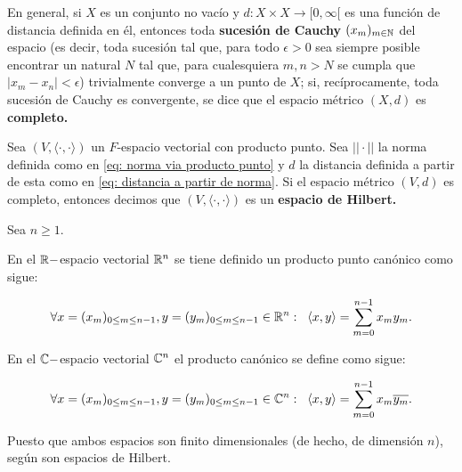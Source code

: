 En general, si $X$ es un conjunto no vacío y 
$d: X \times X \longrightarrow [0, \infty[$ es una función de distancia
definida en él, entonces toda \textbf{sucesión de Cauchy}
$(x_{m})_{m \in \mathbb{N}}$ del espacio (es decir, toda sucesión
tal que, para todo $\epsilon >0$ sea siempre posible encontrar
un natural $N$ tal que, para cualesquiera $m, n >N$ se cumpla que
$|x_{m}-x_{n}| < \epsilon$) trivialmente converge a un punto
de $X$; 
si, recíprocamente, toda sucesión de Cauchy es convergente, 
se dice que el espacio métrico $(X, d)$ es \textbf{completo.}



\begin{defi}
\label{def: espacio de Hilbert}
Sea $(V, \langle \cdot , \cdot \rangle )$ un $F$-espacio
vectorial con producto punto. Sea $|| \cdot ||$ la norma definida como en 
\eqref{eq: norma via producto punto} y 
$d$ la distancia definida a partir de esta como en 
\eqref{eq: distancia a partir de norma}. Si el espacio
métrico $(V, d)$ es completo, entonces decimos que 
$(V, \langle \cdot , \cdot \rangle )$ es un \textbf{espacio de Hilbert.}
\end{defi}


\begin{ejemplo}
Sea $n \geq 1$.

En el $\mathbb{R}-$espacio vectorial $\mathbb{R}^{n}$ se tiene definido un 
producto punto canónico como sigue:

\begin{equation}
\label{eq: producto punto Rn}
\forall x=(x_{m})_{0 \leq m \leq n-1}, 
y=(y_{m})_{0 \leq m \leq n-1} \in \mathbb{R}^{n}: \hspace{0.2cm}
\langle x, y \rangle = \sum\limits_{m=0}^{n-1}x_{m} y_{m}.
\end{equation}

\noindent
En el $\mathbb{C}-$espacio vectorial $\mathbb{C}^{n}$ el producto canónico
se define como sigue: 


\begin{equation}
\label{eq: producto punto Cn}
\forall x=(x_{m})_{0 \leq m \leq n-1}, 
y=(y_{m})_{0 \leq m \leq n-1} \in \mathbb{C}^{n}: \hspace{0.2cm}
\langle x, y \rangle = \sum\limits_{m=0}^{n-1}x_{m} \overline{y_{m}}.
\end{equation}

Puesto que ambos espacios son finito dimensionales
(de hecho, de dimensión $n$), según \cite{mse3}
son espacios de Hilbert.
\final
\end{ejemplo}